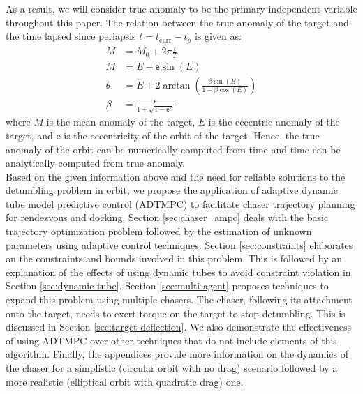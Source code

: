 As a result, we will consider true anomaly to be the primary independent variable throughout this paper.
The relation between the true anomaly of the target and the time lapsed since periapsis $t=t_{\text{curr}}-t_p$ is given as:
\begin{subequations}
\begin{align}
    M&=M_0+2\pi\frac{t}{T}\\
    M&=E-{\mathsf{e}}\sin(E)\\
    \theta&=E+2\arctan\left(\frac{\beta\sin(E)}{1-\beta\cos(E)}\right)\\
    \beta&=\frac{{\mathsf{e}}}{1+\sqrt{1-{\mathsf{e}}^2}}
\end{align}
\end{subequations}
where $M$ is the mean anomaly of the target, $E$ is the eccentric anomaly of the target, and ${\mathsf{e}}$ is the eccentricity of the orbit of the target.
Hence, the true anomaly of the orbit can be numerically computed from time and time can be analytically computed from true anomaly.\\
Based on the given information above and the need for reliable solutions to the detumbling problem in orbit, we propose the application of adaptive dynamic tube model predictive control (ADTMPC) to facilitate chaser trajectory planning for rendezvous and docking.
Section \ref{sec:chaser_ampc} deals with the basic trajectory optimization problem followed by the estimation of unknown parameters using adaptive control techniques.
Section \ref{sec:constraints} elaborates on the constraints and bounds involved in this problem. 
This is followed by an explanation of the effects of using dynamic tubes to avoid constraint violation in Section \ref{sec:dynamic-tube}.
Section \ref{sec:multi-agent} proposes techniques to expand this problem using multiple chasers.
The chaser, following its attachment onto the target, needs to exert torque on the target to stop detumbling.
This is discussed in Section \ref{sec:target-deflection}.
We also demonstrate the effectiveness of using ADTMPC over other techniques that do not include elements of this algorithm.
Finally, the appendices provide more information on the dynamics of the chaser for a simplistic (circular orbit with no drag) scenario followed by a more realistic (elliptical orbit with quadratic drag) one.